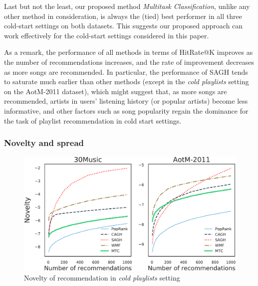 Last but not the least, our proposed method {\it Multitask Classification}, unlike any other method in consideration,
is always the (tied) best performer in all three cold-start settings on both datasets.
This suggests our proposed approach can work effectively for the cold-start settings considered in this paper.

As a remark, the performance of all methods in terms of HitRate@K improves as the number of recommendations increases,
and the rate of improvement decreases as more songs are recommended.
In particular, the performance of SAGH tends to saturate much earlier than other methods 
(except in the \emph{cold playlists} setting on the AotM-2011 dataset),
which might suggest that, as more songs are recommended, artists in users' listening history (or popular artists) become less informative,
and other factors such as song popularity regain the dominance for the task of playlist recommendation in cold start settings.


\subsubsection{Novelty and spread}

\begin{figure}[!t]
    \centering
    \includegraphics[width=\columnwidth]{fig/nov3.pdf}
    \caption{Novelty of recommendation in \emph{cold playlists} setting}
\end{figure}



